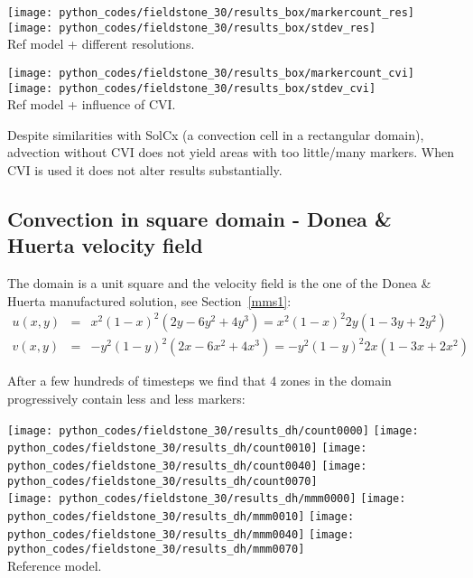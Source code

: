 \begin{center}
\texttt{[image: python\_codes/fieldstone\_30/results\_box/markercount\_res]}
\texttt{[image: python\_codes/fieldstone\_30/results\_box/stdev\_res]}\\
{\captionfont Ref model + different resolutions.}
\end{center}

\begin{center}
\texttt{[image: python\_codes/fieldstone\_30/results\_box/markercount\_cvi]}
\texttt{[image: python\_codes/fieldstone\_30/results\_box/stdev\_cvi]}\\
{\captionfont Ref model + influence of CVI.}
\end{center}

Despite similarities with SolCx (a convection cell in a rectangular domain),
advection without CVI does not yield areas with too little/many markers.
When CVI is used it does not alter results substantially.


\newpage
\subsection*{Convection in square domain - Donea \& Huerta velocity field}

The domain is a unit square and the velocity field is the one of the 
Donea \& Huerta manufactured solution, see Section~\ref{mms1}:
\begin{eqnarray}
u(x,y) &=& x^2(1- x)^2 (2y - 6y^2 + 4y^3) = x^2(1-x)^2 2y (1-3y+2y^2) \nonumber\\
v(x,y) &=& -y^2 (1 - y)^2 (2x - 6x^2 + 4x^3) = -y^2 (1 - y)^2 2x (1-3x+2x^2) 
\end{eqnarray}

After a few hundreds of timesteps we find that 4 zones in the domain 
progressively contain less and less markers:

\begin{center}
\texttt{[image: python\_codes/fieldstone\_30/results\_dh/count0000]}
\texttt{[image: python\_codes/fieldstone\_30/results\_dh/count0010]}
\texttt{[image: python\_codes/fieldstone\_30/results\_dh/count0040]}
\texttt{[image: python\_codes/fieldstone\_30/results\_dh/count0070]}\\
\texttt{[image: python\_codes/fieldstone\_30/results\_dh/mmm0000]}
\texttt{[image: python\_codes/fieldstone\_30/results\_dh/mmm0010]}
\texttt{[image: python\_codes/fieldstone\_30/results\_dh/mmm0040]}
\texttt{[image: python\_codes/fieldstone\_30/results\_dh/mmm0070]}\\
{\captionfont Reference model.}
\end{center}

